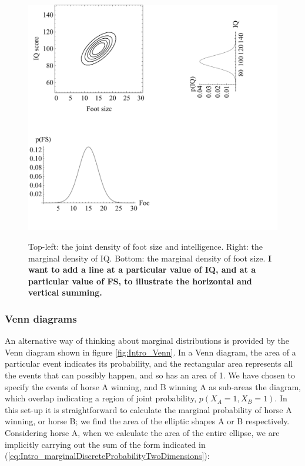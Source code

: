 \documentclass[11pt,fullpage]{book}
\begin{document}
\begin{figure}
\centering
\scalebox{0.5} 
{\includegraphics{Intro_footSizeIntelligenceMarginal.pdf}}
\caption{Top-left: the joint density of foot size and intelligence. Right: the marginal density of IQ. Bottom: the marginal density of foot size. \textbf{I want to add a line at a particular value of IQ, and at a particular value of FS, to illustrate the horizontal and vertical summing.}}\label{fig:Intro_footSizeIntelligenceMarginal}
\end{figure}

\subsubsection*{Venn diagrams}

An alternative way of thinking about marginal distributions is provided by the Venn diagram shown in figure \ref{fig:Intro_Venn}. In a Venn diagram, the area of a particular event indicates its probability, and the rectangular area represents all the events that can possibly happen, and so has an area of 1. We have chosen to specify the events of horse A winning, and B winning A as sub-areas the diagram, which overlap indicating a region of joint probability, $p(X_A=1,X_B=1)$. In this set-up it is straightforward to calculate the marginal probability of horse A winning, or horse B; we find the area of the elliptic shapes A or B respectively. Considering horse A, when we calculate the area of the entire ellipse, we are implicitly carrying out the sum of the form indicated in (\ref{eq:Intro_marginalDiscreteProbabilityTwoDimensions}):
\end{document}
